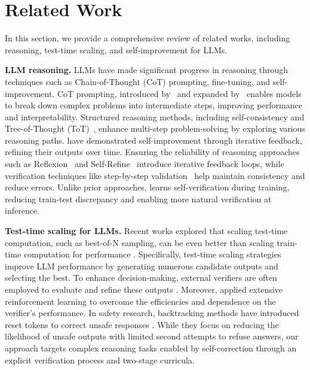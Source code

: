 \section{Related Work}
\label{sec:related}


In this section, we provide a comprehensive review of related works, including reasoning, test-time scaling, and self-improvement for LLMs.

\textbf{LLM reasoning.} LLMs have made significant progress in reasoning through techniques such as Chain-of-Thought (CoT) prompting, fine-tuning, and self-improvement. CoT prompting, introduced by~\citep{wei2022emergent} and expanded by~\citep{kojima2022large} enables models to break down complex problems into intermediate steps, improving performance and interpretability. Structured reasoning methods, including self-consistency \citep{wang2022self} and Tree-of-Thought (ToT)~\citep{yao2024tree}, enhance multi-step problem-solving by exploring various reasoning paths. \citet{huang2022large} have demonstrated self-improvement through iterative feedback, refining their outputs over time. Ensuring the reliability of reasoning approaches such as Reflexion~\citep{shinn2024reflexion} and Self-Refine~\citep{madaan2023selfrefine} introduce iterative feedback loops, while verification techniques like step-by-step validation~\citep{lightman2023let} help maintain consistency and reduce errors. Unlike prior approaches, \sname learns self-verification during training, reducing train-test discrepancy and enabling more natural verification at inference.

\textbf{Test-time scaling for LLMs.} Recent works explored that scaling test-time computation, such as best-of-N sampling, can be even better than scaling train-time computation for performance \citep{snell2024testcompute}. Specifically, test-time scaling strategies improve LLM performance by generating numerous candidate outputs and selecting the best. To enhance decision-making, external verifiers are often employed to evaluate and refine these outputs \citep{liang2024improving}. Moreover, \citet{kumar2024score, qu2024rise} applied extensive reinforcement learning to overcome the efficiencies and dependence on the verifier's performance. In safety research, backtracking methods have introduced reset tokens to correct unsafe responses \citep{zhang2024backtracking}. While they focus on reducing the likelihood of unsafe outputs with limited second attempts to refuse answers, our approach targets complex reasoning tasks enabled by self-correction through an explicit verification process and two-stage curricula.

